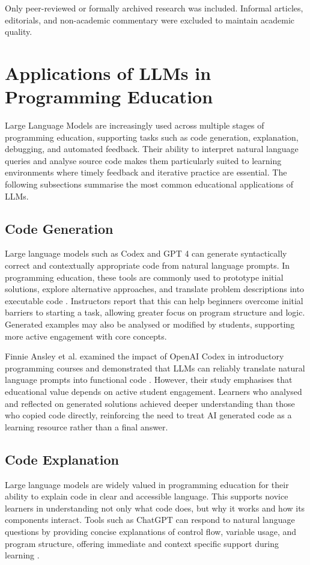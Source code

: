 \documentclass[10pt,journal,compsoc]{IEEEtran}
\begin{document}
Only peer-reviewed or formally archived research was included. Informal articles, editorials, and non-academic commentary were excluded to maintain academic quality.

\section{Applications of LLMs in Programming Education}
\label{sec:applications}
Large Language Models are increasingly used across multiple stages of programming education, supporting tasks such as code generation, explanation, debugging, and automated feedback. Their ability to interpret natural language queries and analyse source code makes them particularly suited to learning environments where timely feedback and iterative practice are essential. The following subsections summarise the most common educational applications of LLMs.

\subsection{Code Generation}
Large language models such as Codex and GPT 4 can generate syntactically correct and contextually appropriate code from natural language prompts. In programming education, these tools are commonly used to prototype initial solutions, explore alternative approaches, and translate problem descriptions into executable code \cite{FinnieAnsley2022, Kasneci2023}. Instructors report that this can help beginners overcome initial barriers to starting a task, allowing greater focus on program structure and logic. Generated examples may also be analysed or modified by students, supporting more active engagement with core concepts.

Finnie Ansley et al. examined the impact of OpenAI Codex in introductory programming courses and demonstrated that LLMs can reliably translate natural language prompts into functional code \cite{FinnieAnsley2022}. However, their study emphasises that educational value depends on active student engagement. Learners who analysed and reflected on generated solutions achieved deeper understanding than those who copied code directly, reinforcing the need to treat AI generated code as a learning resource rather than a final answer.

\subsection{Code Explanation}
Large language models are widely valued in programming education for their ability to explain code in clear and accessible language. This supports novice learners in understanding not only what code does, but why it works and how its components interact. Tools such as ChatGPT can respond to natural language questions by providing concise explanations of control flow, variable usage, and program structure, offering immediate and context specific support during learning \cite{Deriba2023, Leinonen2022}.
\end{document}
